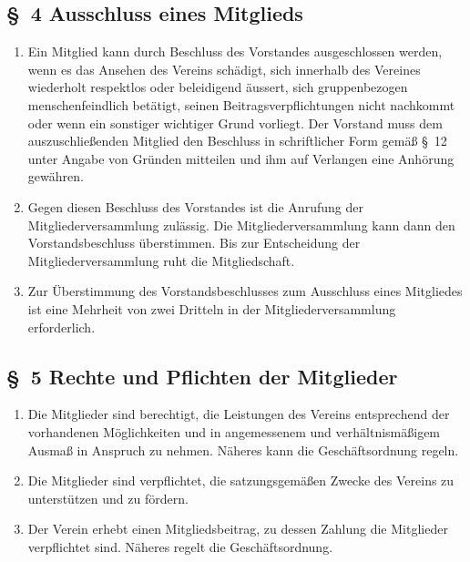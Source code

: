 \documentclass[10pt,a4paper]{scrartcl}
\begin{document}
\subsection*{\S \ 4 Ausschluss eines Mitglieds }
\begin{enumerate}
	\item Ein Mitglied kann durch Beschluss des Vorstandes ausgeschlossen werden, wenn es das
                Ansehen des Vereins sch{\"a}digt, sich innerhalb des Vereines wiederholt respektlos oder 
                beleidigend {\"a}ussert, sich gruppenbezogen menschenfeindlich bet{\"a}tigt, seinen Beitragsverpflichtungen nicht nachkommt oder 
		wenn ein sonstiger wichtiger Grund vorliegt. Der Vorstand muss dem auszuschlie{\ss}enden
		Mitglied den Beschluss in schriftlicher Form gem{\"a}{\ss} \S \ 12 unter Angabe von Gr{\"u}nden
		mitteilen und ihm auf Verlangen eine Anh{\"o}rung gew{\"a}hren.
        \item Gegen diesen Beschluss des Vorstandes ist die Anrufung der Mitgliederversammlung zu\-l{\"a}s\-sig. Die Mitgliederversammlung kann dann den Vorstandsbeschluss {\"u}berstimmen.
				Bis zur Entscheidung der Mitgliederversammlung ruht die Mitgliedschaft.
		\item Zur {\"U}berstimmung des Vorstandsbeschlusses zum Ausschluss eines Mitgliedes ist eine Mehrheit von zwei Dritteln in der Mitgliederversammlung erforderlich.
	
\end{enumerate}
%
%
\subsection*{\S \ 5 Rechte und Pflichten der Mitglieder}
\begin{enumerate}
	\item Die Mitglieder sind berechtigt, die Leistungen des Vereins entsprechend der vorhandenen
		M{\"o}glichkeiten und in angemessenem und verh{\"a}ltnism{\"a}{\ss}igem Ausma{\ss} in Anspruch zu nehmen.
                N{\"a}\-he\-res kann die Gesch{\"a}ftsordnung regeln.
	\item Die Mitglieder sind verpflichtet, die satzungsgem{\"a}{\ss}en Zwecke des Vereins zu unterst{\"u}tzen
		und zu f{\"o}rdern.
	\item Der Verein erhebt einen Mitgliedsbeitrag, zu dessen Zahlung die Mitglieder verpflichtet
		sind. N{\"a}heres regelt die Gesch{\"a}ftsordnung.
        
\end{enumerate}
%
%
\end{document}
